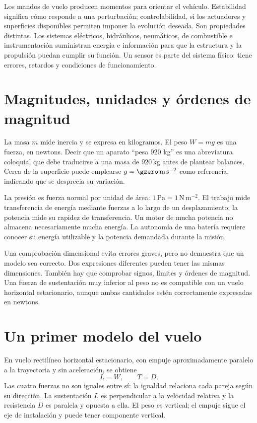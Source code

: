 Los mandos de vuelo producen momentos para orientar el vehículo. Estabilidad significa cómo responde a una perturbación; controlabilidad, si los actuadores y superficies disponibles permiten imponer la evolución deseada. Son propiedades distintas. Los sistemas eléctricos, hidráulicos, neumáticos, de combustible e instrumentación suministran energía e información para que la estructura y la propulsión puedan cumplir su función. Un sensor es parte del sistema físico: tiene errores, retardos y condiciones de funcionamiento.


\section{Magnitudes, unidades y órdenes de magnitud}
La masa $m$ mide inercia y se expresa en kilogramos. El peso $W=mg$ es una fuerza, en newtons. Decir que un aparato ``pesa 920 kg'' es una abreviatura coloquial que debe traducirse a una masa de $920\,\mathrm{kg}$ antes de plantear balances. Cerca de la superficie puede emplearse $g=\gzero\,\mathrm{m\,s^{-2}}$ como referencia, indicando que se desprecia su variación.

La presión es fuerza normal por unidad de área: $1\,\mathrm{Pa}=1\,\mathrm{N\,m^{-2}}$. El trabajo mide transferencia de energía mediante fuerzas a lo largo de un desplazamiento; la potencia mide su rapidez de transferencia. Un motor de mucha potencia no almacena necesariamente mucha energía. La autonomía de una batería requiere conocer su energía utilizable y la potencia demandada durante la misión.

Una comprobación dimensional evita errores graves, pero no demuestra que un modelo sea correcto. Dos expresiones diferentes pueden tener las mismas dimensiones. También hay que comprobar signos, límites y órdenes de magnitud. Una fuerza de sustentación muy inferior al peso no es compatible con un vuelo horizontal estacionario, aunque ambas cantidades estén correctamente expresadas en newtons.

\section{Un primer modelo del vuelo}
En vuelo rectilíneo horizontal estacionario, con empuje aproximadamente paralelo a la trayectoria y sin aceleración, se obtiene
\begin{equation}
 L=W,\qquad T=D.
\end{equation}
Las cuatro fuerzas no son iguales entre sí: la igualdad relaciona cada pareja según su dirección. La sustentación $L$ es perpendicular a la velocidad relativa y la resistencia $D$ es paralela y opuesta a ella. El peso es vertical; el empuje sigue el eje de instalación y puede tener componente vertical.

